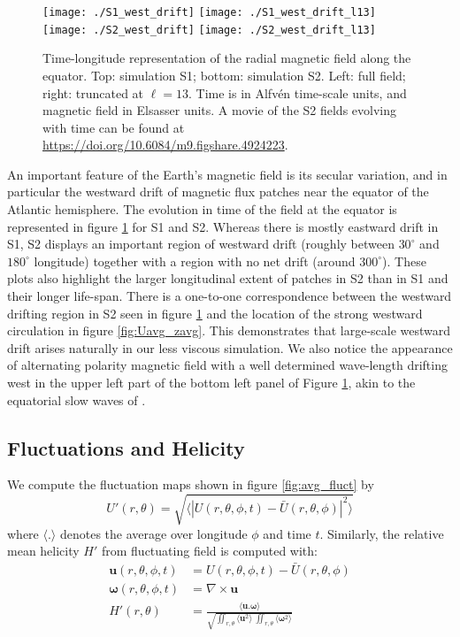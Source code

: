 \documentclass[12pt, a4paper]{article}
\begin{document}
\begin{figure}
\centering
\texttt{[image: ./S1\_west\_drift]}
\texttt{[image: ./S1\_west\_drift\_l13]} \\
\texttt{[image: ./S2\_west\_drift]}
\texttt{[image: ./S2\_west\_drift\_l13]}

\caption{Time-longitude representation of the radial magnetic field along the equator.
Top: simulation S1; bottom: simulation S2. Left: full field; right: truncated at $\ell=13$.
Time is in Alfvén time-scale units, and magnetic field in Elsasser units.
A movie of the S2 fields evolving with time can be found at \url{https://doi.org/10.6084/m9.figshare.4924223}.
}
\label{fig:wdrift}
\end{figure}

An important feature of the Earth's magnetic field is its secular variation, and in particular the westward drift of magnetic flux patches near the equator of the Atlantic hemisphere.
The evolution in time of the field at the equator is represented in figure \ref{fig:wdrift} for S1 and S2.
Whereas there is mostly eastward drift in S1, S2 displays an important region of westward drift (roughly between $30^\circ$ and $180^\circ$ longitude) together with a region with no net drift (around $300^\circ$).
These plots also highlight the larger longitudinal extent of patches in S2 than in S1 and their longer life-span.
There is a one-to-one correspondence between the westward drifting region in S2 seen in figure \ref{fig:wdrift} and the location of the strong westward circulation in figure \ref{fig:Uavg_zavg}.
This demonstrates that large-scale westward drift arises naturally in our less viscous simulation.
We also notice the appearance of alternating polarity magnetic field with a well determined wave-length drifting west in the upper left part of the bottom left panel of Figure \ref{fig:wdrift}, akin to the equatorial slow waves of \citet{finlay2003}.

\subsection{Fluctuations and Helicity}

We compute the fluctuation maps shown in figure \ref{fig:avg_fluct} by
\begin{equation}
U'(r,\theta) = \sqrt{\langle|U(r,\theta,\phi,t) - \bar{U}(r,\theta,\phi)|^2\rangle}
\end{equation}
where $\langle.\rangle$ denotes the average over longitude $\phi$ and time $t$.
Similarly, the relative mean helicity $H'$ from fluctuating field is computed with:
\begin{align}
\mathbf{u}(r,\theta,\phi,t) &= U(r,\theta,\phi,t) - \bar{U}(r,\theta,\phi) \\
\mathbf{\omega}(r,\theta,\phi,t) &= \nabla \times \mathbf{u}  \\
H'(r,\theta) &= \frac{\langle\mathbf{u}.\mathbf{\omega}\rangle}{\sqrt{\iint_{r,\theta}\langle\mathbf{u}^2\rangle \: \iint_{r,\theta}\langle\mathbf{\omega}^2\rangle}}
\end{align}
\end{document}
